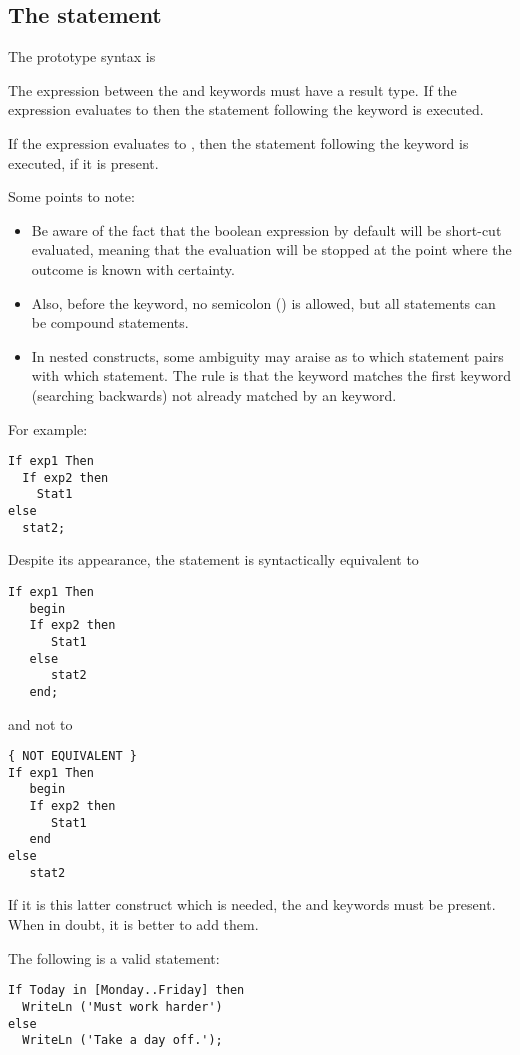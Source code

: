\subsection{The  statement}
The  prototype syntax is

The expression between the  and  keywords must have a
 result type. If the expression evaluates to  then the
statement following the  keyword is executed.

If the expression evaluates to , then the statement following
the  keyword is executed, if it is present.

Some points to note:
\begin{itemize}
\item 
Be aware of the fact that the boolean expression by default will be 
short-cut evaluated, meaning that the evaluation will be stopped at 
the point where the  outcome is known with certainty.
\item
Also, before the  keyword,  no semicolon (\var{;}) is allowed,
but all statements can be compound statements.
\item
In nested  constructs, some ambiguity may araise as
to which   statement pairs with which  statement. The rule
is that the  keyword matches the first  keyword
(searching backwards) not already matched by an  keyword.
\end{itemize}
For example:
\begin{verbatim}
If exp1 Then
  If exp2 then
    Stat1
else
  stat2;
\end{verbatim}
Despite its appearance, the statement is syntactically equivalent to
\begin{verbatim}
If exp1 Then
   begin
   If exp2 then
      Stat1
   else
      stat2
   end;
\end{verbatim}
and not to
\begin{verbatim}
{ NOT EQUIVALENT }
If exp1 Then
   begin
   If exp2 then
      Stat1
   end
else
   stat2
\end{verbatim}
If it is this latter construct which is needed, the  and 
keywords must be present. When in doubt, it is better to add them.

The following is a valid statement:
\begin{verbatim}
If Today in [Monday..Friday] then
  WriteLn ('Must work harder')
else
  WriteLn ('Take a day off.');
\end{verbatim}

